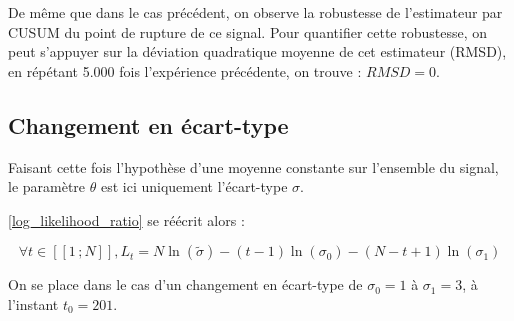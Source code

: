 \documentclass[french,11pt,notitlepage]{report}
\begin{document}
	De même que dans le cas précédent, on observe la robustesse de l'estimateur par CUSUM du point de rupture de ce signal. Pour quantifier cette robustesse, on peut s'appuyer sur la déviation quadratique moyenne de cet estimateur (RMSD), en répétant 5.000 fois l'expérience précédente, on trouve : $RMSD = 0$.
	
	
	\subsection{Changement en écart-type}
	
	
	Faisant cette fois l'hypothèse d'une moyenne constante sur l'ensemble du signal, le paramètre $\theta$ est ici uniquement l'écart-type $\sigma$.
	
	\ref{log_likelihood_ratio} se réécrit alors : 
	
	\begin{equation}
		\forall t \in [\![1\,; N]\!], L_t = N\ln (\tilde{\sigma}) - (t-1)\ln ({\sigma_0}) - (N-t+1)\ln ({\sigma_1})
		\label{stdchange}
	\end{equation}
	
		On se place dans le cas d'un changement en écart-type de $\sigma_0 = 1$ à $\sigma_1 = 3$, à l'instant $t_0 = 201$.
	
\end{document}
